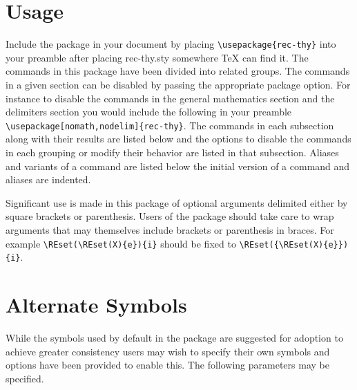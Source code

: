 \documentclass[leqno,11pt]{amsart}
\begin{document}
\section{Usage}
Include the package in your document by placing \verb=\usepackage{rec-thy}= into your preamble after placing rec-thy.sty somewhere \TeX{ } can find it.  The commands in this package have been divided into related groups.  The commands in a given section can be disabled by passing the appropriate package option.  For instance to disable the commands in the general mathematics section and the delimiters section you would include the following in your preamble \verb=\usepackage[nomath,nodelim]{rec-thy}=.  The commands in each subsection along with their results are listed below and the options to disable the commands in each grouping or modify their behavior are listed in that subsection.  Aliases and variants of a command are listed below the initial version of a command and aliases are indented.

Significant use is made in this package of optional arguments delimited either by square brackets or parenthesis.  Users of the package should take care to wrap arguments that may themselves include brackets or parenthesis in braces.  For example \verb=\REset(\REset(X){e}){i}= should be fixed to \verb=\REset({\REset(X){e}}){i}=.

\section{Alternate Symbols}
While the symbols used by default in the package are suggested for adoption to achieve greater consistency users may wish to specify their own symbols and options have been provided to enable this.  The following parameters may be specified.
\end{document}
